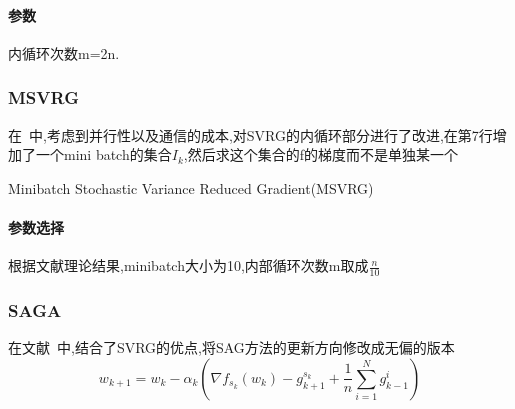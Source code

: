 \documentclass[UTF8]{ctexart}
\begin{document}
\paragraph{参数}
内循环次数m=2n.
\subsubsection{MSVRG}
在~\cite{reddi2016stochastic}中,考虑到并行性以及通信的成本,对SVRG的内循环部分进行了改进,在第7行增加了一个mini batch的集合$I_k$,然后求这个集合的f的梯度而不是单独某一个
\begin{algorithm}
    \SetAlgoNoLine %

    \BlankLine

    \caption{Minibatch Stochastic Variance Reduced Gradient(MSVRG)\label{al2}}
\end{algorithm}
\paragraph{参数选择}
根据文献理论结果,minibatch大小为10,内部循环次数m取成$\frac{n}{10}$
  \subsubsection{SAGA}
  在文献~\cite{defazio2014saga}中,结合了SVRG的优点,将SAG方法的更新方向修改成无偏的版本
  $$w_{k+1}=w_k-\alpha_k(\nabla f_{s_k}(w_k)-g_{k+1}^{s_k}+\frac{1}{n}\sum_{i=1}^{N}g_{k-1}^i)$$
\end{document}
